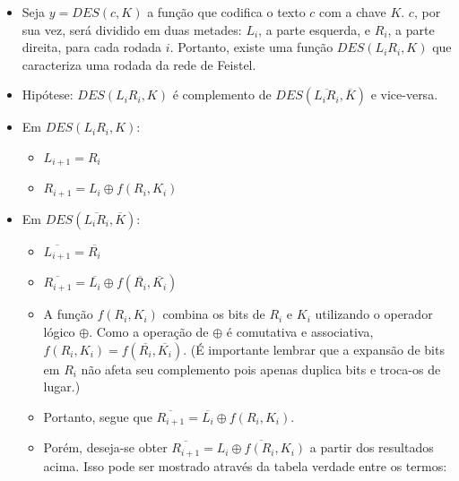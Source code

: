 \documentclass{article}
\begin{document}
\begin{itemize}

    \item Seja $y = DES(c, K)$ a função que codifica o texto $c$ com a chave
        $K$. $c$, por sua vez, será dividido em duas metades: $L_i$, a parte
        esquerda, e $R_i$, a parte direita, para cada rodada $i$. Portanto,
        existe uma função $DES(L_iR_i, K)$ que caracteriza uma rodada da rede
        de Feistel.

    \item Hipótese: $DES(L_iR_i, K)$ é complemento de $DES(\overline{L_iR_i},
        \overline{K})$ e vice-versa.

    \item Em $DES(L_iR_i, K)$:

    \begin{itemize}

        \item $L_{i+1} = R_i$

        \item $R_{i+1} = L_i \oplus f(R_i,K_i)$

    \end{itemize}

    \item Em $DES(\overline{L_iR_i}, \overline{K})$:

    \begin{itemize}

        \item $\overline{L_{i+1}} = \overline{R_i}$

        \item $\overline{R_{i+1}}
            = \overline{L_i} \oplus f(\overline{R_i},\overline{K_i})$

        \item A função ${f(R_i,K_i)}$ combina os bits de $R_i$ e $K_i$
            utilizando o operador lógico $\oplus$. Como a operação de $\oplus$
            é comutativa e associativa, ${f(R_i,K_i)}
            = f(\overline{R_i},\overline{K_i})$. (É importante lembrar que a
            expansão de bits em $R_i$ não afeta seu complemento pois apenas
            duplica bits e troca-os de lugar.)

        \item Portanto, segue que $\overline{R_{i+1}}
            = \overline{L_i} \oplus f(R_i,K_i)$.

        \item Porém, deseja-se obter $\overline{R_{i+1}}
            = \overline{{L_i} \oplus f(R_i,K_i)}$ a partir dos resultados
            acima. Isso pode ser mostrado através da tabela verdade entre os
            termos:


\end{itemize}
\end{itemize}
\end{document}
